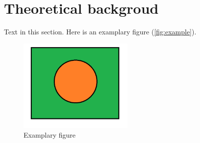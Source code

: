 \section{Theoretical backgroud}

Text in this section. Here is an examplary figure (\autoref{fig:example}).

\begin{figure}
\includegraphics[width=0.5\textwidth]{figures/example.png}
\caption{Examplary figure}
\label{fig:example}
\end{figure}
